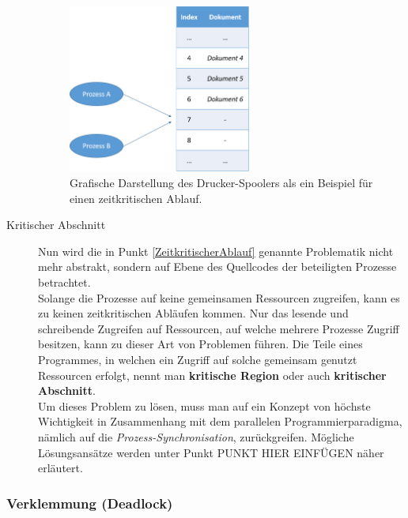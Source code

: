 \begin{description}
						\begin{figure}
							\centering	
							\includegraphics[width=6cm]{Abbildungen/Zeitkritischer_Ablauf_Drucker_Spooler.png}
							\caption{Grafische Darstellung des Drucker-Spoolers als ein Beispiel für einen zeitkritischen Ablauf.}
							\label{fig:ZeitkritischerAblaufDruckerSpooler}
						\end{figure}
					
					\item[Kritischer Abschnitt]

						Nun wird die in Punkt \ref{ZeitkritischerAblauf} genannte Problematik nicht mehr abstrakt, sondern auf Ebene des Quellcodes der beteiligten Prozesse betrachtet.\\
						Solange die Prozesse auf keine gemeinsamen Ressourcen zugreifen, kann es zu keinen zeitkritischen Abläufen kommen. Nur das lesende und schreibende Zugreifen auf Ressourcen, auf welche mehrere Prozesse Zugriff besitzen, kann zu dieser Art von Problemen führen. Die Teile eines Programmes, in welchen ein Zugriff auf solche gemeinsam genutzt Ressourcen erfolgt, nennt man \textbf{kritische Region} oder auch \textbf{kritischer Abschnitt}.\\
						Um dieses Problem zu lösen, muss man auf ein Konzept von höchste Wichtigkeit in Zusammenhang mit dem parallelen Programmierparadigma, nämlich auf die \textit{Prozess-Synchronisation}, zurückgreifen. Mögliche Lösungsansätze werden unter Punkt PUNKT HIER EINFÜGEN näher erläutert.
				\end{description}
				
			\subsubsection{Verklemmung (Deadlock) \cite{ModerneBetriebssysteme}}
			
